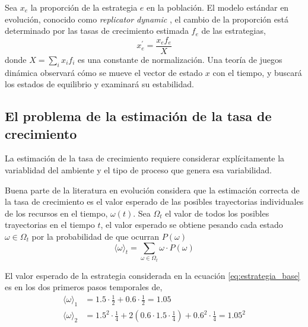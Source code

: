 \documentclass[a4paper,10pt]{article}
\begin{document}
Sea $x_e$ la proporción de la estrategia $e$ en la población.
El modelo estándar en evolución, conocido como \emph{replicator dynamic} \cite{taylor1978-replicatorDynamic, schuster1983-replicatorDynamics, hofbauer2003-evolutionaryGameDynamics}, el cambio de la proporción está determinado por las tasas de crecimiento estimada $f_e$ de las estrategias,
\begin{equation} \label{eq:replicator_dynamic}
x_e^\prime = \frac{x_e f_e}{X}
\end{equation}
donde $X=\sum_i x_i f_i$ es una constante de normalización.
Una teoría de juegos dinámica observará cómo se mueve el vector de estado $x$ con el tiempo, y buscará los estados de equilibrio y examinará su estabilidad.

\subsection{El problema de la estimación de la tasa de crecimiento}

La estimación de la tasa de crecimiento requiere considerar explícitamente la variablidad del ambiente y el tipo de proceso que genera esa variabilidad.

Buena parte de la literatura en evolución considera que la estimación correcta de la tasa de crecimiento es el valor esperado de las posibles trayectorias individuales de los recursos en el tiempo, $\omega(t)$.
Sea $\Omega_t$ el valor de todos los posibles trayectorias en el tiempo $t$, el valor esperado se obtiene pesando cada estado $\omega \in \Omega_t$ por la probabilidad de que ocurran $P(\omega)$
\begin{equation}
\langle \omega \rangle_t = \sum_{\omega \in \Omega_t} \omega \cdot  P(\omega)
\end{equation}

El valor esperado de la estrategia considerada en la ecuación \ref{eq:estrategia_base} es en los dos primeros pasos temporales de, 
\begin{equation}
\begin{split}
\langle \omega \rangle_1 & = 1.5 \cdot \frac{1}{2} + 0.6 \cdot  \frac{1}{2} = 1.05 \\ 
\langle \omega \rangle_2 &=  1.5^2 \cdot \frac{1}{4} + 2 (0.6 \cdot 1.5 \cdot \frac{1}{4} ) + 0.6^2 \cdot \frac{1}{4}= 1.05^2
\end{split}
\end{equation}
\end{document}
